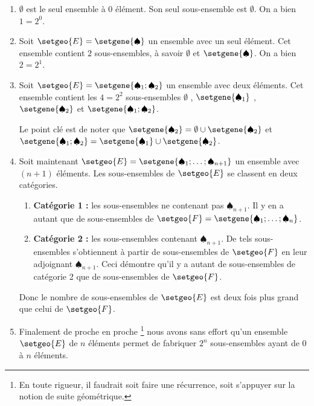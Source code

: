\documentclass[12pt]{amsart}
\begin{document}
\begin{enumerate}
	\medskip
	\item $\emptyset$ est le seul ensemble à $0$ élément. Son seul sous-ensemble est $\emptyset$. On a bien $1 = 2^0$.


	\medskip
	\item Soit $\setgeo{E} = \setgene{\spadesuit}$ un ensemble avec un seul élément. Cet ensemble contient $2$ sous-ensembles, à savoir $\emptyset$ et $\setgene{\spadesuit}$. On a bien $2 = 2^1$.


	\medskip
	\item Soit $\setgeo{E} = \setgene{\spadesuit_1 ; \spadesuit_2}$ un ensemble avec deux éléments.
	      Cet ensemble contient les $4 = 2^2$ sous-ensembles
	      $\emptyset$ , $\setgene{\spadesuit_1}$ ,
	      $\setgene{\spadesuit_2}$ et $\setgene{\spadesuit_1 ; \spadesuit_2}$.
	
	      \noindent
	      Le point clé est de noter que
	      $\setgene{\spadesuit_2} = \emptyset \cup \setgene{\spadesuit_2}$ et
	      $\setgene{\spadesuit_1 ; \spadesuit_2} = \setgene{\spadesuit_1} \cup \setgene{\spadesuit_2}$.

	\medskip
	\item Soit maintenant $\setgeo{E} = \setgene{\spadesuit_1 ; \dots ; \spadesuit_{n+1}}$ un ensemble avec $(n+1)$ éléments.
		  Les sous-ensembles de $\setgeo{E}$ se classent en deux catégories.
		  
		  \begin{enumerate}
		  		\smallskip
				\item \textbf{Catégorie 1 :} les sous-ensembles ne contenant pas $\spadesuit_{n+1}$.
				      Il y en a autant que de sous-ensembles de $\setgeo{F} = \setgene{\spadesuit_1 ; \dots ; \spadesuit_{n}}$.
		  		
				\smallskip
				\item \textbf{Catégorie 2 :} les sous-ensembles contenant $\spadesuit_{n+1}$.
				      De tels sous-ensembles s'obtiennent à partir de sous-ensembles de $\setgeo{F}$ en leur adjoignant $\spadesuit_{n+1}$.
				      Ceci démontre qu'il y a autant de sous-ensembles de catégorie 2 que de sous-ensembles de $\setgeo{F}$.
		  \end{enumerate}

		  \noindent
		  Donc le nombre de sous-ensembles de $\setgeo{E}$ est deux fois plus grand que celui de $\setgeo{F}$.


	\medskip
	\item Finalement de proche en proche
	\footnote{
		En toute rigueur, il faudrait soit faire une récurrence, soit s'appuyer sur la notion de suite géométrique.
	}
	nous avons sans effort qu'un ensemble $\setgeo{E}$ de $n$ éléments permet de fabriquer $2^n$ sous-ensembles ayant de $0$ à $n$ éléments.
\end{enumerate}
\end{document}
